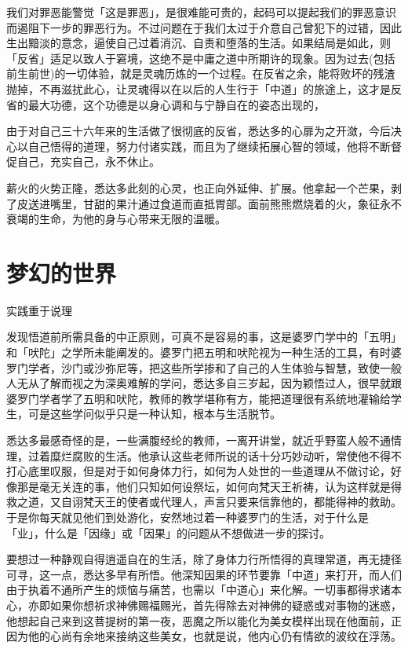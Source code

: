 \documentclass[12pt,twoside,openany]{book}
\begin{document}
我们对罪恶能警觉「这是罪恶」，是很难能可贵的，起码可以提起我们的罪恶意识而遏阻下一步的罪恶行为。不过问题在于我们太过于介意自己曾犯下的过错，因此生出黯淡的意念，逼使自己过着消沉、自责和堕落的生活。如果结局是如此，则「反省」适足以致人于窘境，这绝不是中庸之道中所期许的现象。因为过去(包括前生前世)的一切体验，就是灵魂历炼的一个过程。在反省之余，能将败坏的残渣抛掉，不再滋扰此心，让灵魂得以在以后的人生行于「中道」的旅途上，这才是反省的最大功德，这个功德是以身心调和与宁静自在的姿态出现的，



由于对自己三十六年来的生活做了很彻底的反省，悉达多的心扉为之开潋，今后决心以自己悟得的道理，努力付诸实践，而且为了继续拓展心智的领域，他将不断督促自己，充实自己，永不休止。

薪火的火势正隆，悉达多此刻的心灵，也正向外延伸、扩展。他拿起一个芒果，剥了皮送进嘴里，甘甜的果汁通过食道而直抵胃部。面前熊熊燃烧着的火，象征永不衰竭的生命，为他的身与心带来无限的温暖。

\section{梦幻的世界}\label{sec1.14}

实践重于说理

发现悟道前所需具备的中正原则，可真不是容易的事，这是婆罗门学中的「五明」和「吠陀」之学所未能阐发的。婆罗门把五明和吠陀视为一种生活的工具，有时婆罗门学者，沙门或沙弥尼等，把这些所学掺和了自己的人生体验与智慧，致使一般人无从了解而视之为深奥难解的学问，悉达多自三岁起，因为颖悟过人，很早就跟婆罗门学者学了五明和吠陀，教师的教学堪称有方，能把道理很有系统地灌输给学生，可是这些学问似乎只是一种认知，根本与生活脱节。

悉达多最感奇怪的是，一些满腹经纶的教师，一离开讲堂，就近乎野蛮人般不通情理，过着糜烂腐败的生活。他承认这些老师所说的话十分巧妙动听，常使他不得不打心底里叹服，但是对于如何身体力行，如何为人处世的一些道理从不做讨论，好像那是毫无关连的事，他们只知如何设祭坛，如何向梵天王祈祷，认为这样就是得救之道，又自诩梵天王的使者或代理人，声言只要来信靠他的，都能得神的救助。于是你每天就见他们到处游化，安然地过着一种婆罗门的生活，对于什么是「业」，什么是「因缘」或「因果」的问题从不想做进一步的探讨。

要想过一种静观自得逍遥自在的生活，除了身体力行所悟得的真理常道，再无捷径可寻，这一点，悉达多早有所悟。他深知因果的环节要靠「中道」来打开，而人们由于执着不通所产生的烦恼与痛苦，也需以「中道心」来化解。一切事都得求诸本心，亦即如果你想祈求神佛赐福赐光，首先得除去对神佛的疑惑或对事物的迷惑，他想起自己来到这菩提树的第一夜，恶魔之所以能化为美女模样出现在他面前，正因为他的心尚有余地来接纳这些美女，也就是说，他内心仍有情欲的波纹在浮荡。
\end{document}
